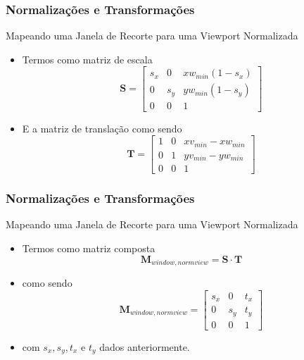 \documentclass{beamer}
\begin{document}
\begin{frame}
\frametitle{Normalizações e Transformações }

	\begin{block}{Mapeando uma Janela de Recorte para uma Viewport Normalizada}
		\begin{itemize}
			\item Termos como matriz de escala\\
			\begin{equation*}
				\textbf{S} = \begin{bmatrix}
					s_x	&	0	&	xw_{min}(1-s_x) \\
					0	&	s_y	&	yw_{min}(1-s_y) \\
					0	&	0	&	1
				\end{bmatrix}
			\end{equation*}
			
			\item E a matriz de translação como sendo\\
			\begin{equation*}
				\textbf{T} = \begin{bmatrix}
					1	&	0	&	xv_{min} - xw_{min} \\
					0	&	1	&	yv_{min} - yw_{min} \\
					0	&	0	&	1
				\end{bmatrix}
			\end{equation*}			 
		\end{itemize}	
	\end{block}
\end{frame}


\begin{frame}
\frametitle{Normalizações e Transformações }

	\begin{block}{Mapeando uma Janela de Recorte para uma Viewport Normalizada}
		\begin{itemize}
			\item Termos como matriz composta
			\begin{equation*}
				\textbf{M}_{window,normview} = \textbf{S} \cdot \textbf{T}
			\end{equation*}
			
			\item como sendo\\
			\begin{equation*}
				\textbf{M}_{window,normview} = \begin{bmatrix}
					s_x	&	0	&	t_x \\
					0	&	s_y	&	t_y \\
					0	&	0	&	1
				\end{bmatrix}
			\end{equation*}	
			\item com $s_x,s_y,t_x$ e $t_y$ dados anteriormente.		 
		\end{itemize}	
	\end{block}
\end{frame}
\end{document}
